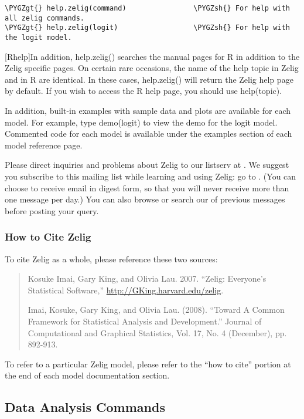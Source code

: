 \documentclass[letterpaper,10pt,english]{sphinxmanual}
\def\PYGZgt{\char`\>}
\def\PYGZsh{\char`\#}
\begin{document}
\begin{Verbatim}[commandchars=\\\{\}]
\PYGZgt{} help.zelig(command)                \PYGZsh{} For help with all zelig commands.
\PYGZgt{} help.zelig(logit)                  \PYGZsh{} For help with the logit model.
\end{Verbatim}

{[}Rhelp{]}In addition, help.zelig() searches the manual pages for R in
addition to the Zelig specific pages. On certain rare occasions, the
name of the help topic in Zelig and in R are identical. In these cases,
help.zelig() will return the Zelig help page by default. If you wish to
access the R help page, you should use help(topic).

In addition, built-in examples with sample data and plots are available
for each model. For example, type demo(logit) to view the demo for the
logit model. Commented code for each model is available under the
examples section of each model reference page.

Please direct inquiries and problems about Zelig to our listserv at . We
suggest you subscribe to this mailing list while learning and using
Zelig: go to . (You can choose to receive email in digest form, so that
you will never receive more than one message per day.) You can also
browse or search our of previous messages before posting your query.


\subsubsection{How to Cite Zelig}
\label{docs/user_guide:how-to-cite-zelig}
To cite Zelig as a whole, please reference these two sources:
\begin{quote}

Kosuke Imai, Gary King, and Olivia Lau. 2007. “Zelig: Everyone’s
Statistical Software,” \href{http://GKing.harvard.edu/zelig}{http://GKing.harvard.edu/zelig}.

Imai, Kosuke, Gary King, and Olivia Lau. (2008). “Toward A Common
Framework for Statistical Analysis and Development.” Journal of
Computational and Graphical Statistics, Vol. 17, No. 4 (December),
pp. 892-913.
\end{quote}

To refer to a particular Zelig model, please refer to the “how to cite”
portion at the end of each model documentation section.


\subsection{Data Analysis Commands}
\label{docs/user_guide:userguide-data-analysis}\label{docs/user_guide:data-analysis-commands}
\end{document}
